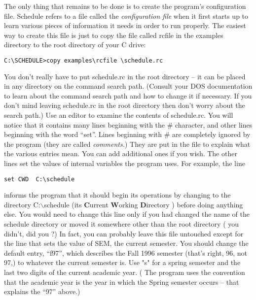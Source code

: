 The only thing that remains to be done is to create the program's configuration
file. Schedule refers to a file called the {\it configuration file} when it first
starts up to learn various pieces of information it needs in order to run
properly. The easiest way to create this file is just to copy the file
called rcfile in the examples directory to the root directory of your
C drive:
\smallskip
\begin{verbatim}
C:\SCHEDULE>copy examples\rcfile \schedule.rc
\end{verbatim}
\smallskip
You don't really have to put schedule.rc in the root directory -- it can
be placed in any directory on the command search path. (Consult your
DOS documentation to learn about the command search path and how to
change it if necessary. If you don't mind leaving schedule.rc in the
root directory then don't worry about the search path.) 
Use an editor to examine the contents of schedule.rc. You will notice that it
contains many lines beginning with the \# character, and other lines beginning
with the word ``set''. Lines beginning with \# are completely ignored by the
program (they are called {\it comments.}) They are put in the file to explain
what the various entries mean. You can add additional ones if you wish. 
The other lines set the values of  internal variables the program
uses. For example, the line
\smallskip
\begin{verbatim}
set CWD  C:\schedule
\end{verbatim}
\smallskip
informs the program that it should begin its operations by changing to the
directory C:$\backslash${schedule} (its {\bf C}urrent {\bf W}orking {\bf D}irectory )
before doing anything else. You would need to change this line only if
you had changed the name of the schedule directory or moved it somewhere other
than the root directory ( you didn't, did you ?) In fact, you can probably leave
this file untouched except for the line that sets the value of SEM, the
current semester. You should change the default entry, ``f97'', which 
describes the Fall 1996 semester (that's right, 96, not 97,) to whatever
the current semester is. Use "s" for a spring semester and the last two
digits of the current academic year. ( The program uses the convention that
the academic year is the year in which the Spring semester occurs -- that
explains the ``97'' above.)

